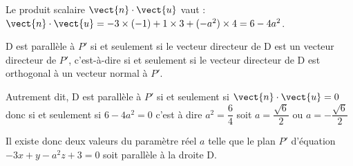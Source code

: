 \begin{enumerate}
Le produit scalaire $\vect{n}\cdot\vect{u}$ vaut :\quad $\vect{n}\cdot\vect{u} = -3\times (-1) + 1 \times 3 + (-a^2 )\times 4 = 6-4a^2$.

D est parallèle à $P'$ si et seulement si le vecteur directeur de D est un vecteur directeur de $P'$, c'est-à-dire si et seulement si le vecteur directeur de D est orthogonal à un vecteur normal à $P'$.

Autrement dit, D est parallèle à $P'$ si et seulement si $\vect{n}\cdot\vect{u} = 0$ donc si et seulement si $ 6-4a^2 = 0$ c'est à dire $a^2=\dfrac{6}{4}$ soit $ a= \dfrac{\sqrt{6}}{2}$ ou $a=-\dfrac{\sqrt{6}}{2}$

Il  existe donc deux valeurs du paramètre réel $a$ telle que le plan $P'$ d'équation $-3 x+y-a^{2} z+3=0$ soit parallèle à la droite D.
		\end{enumerate}


\medskip
